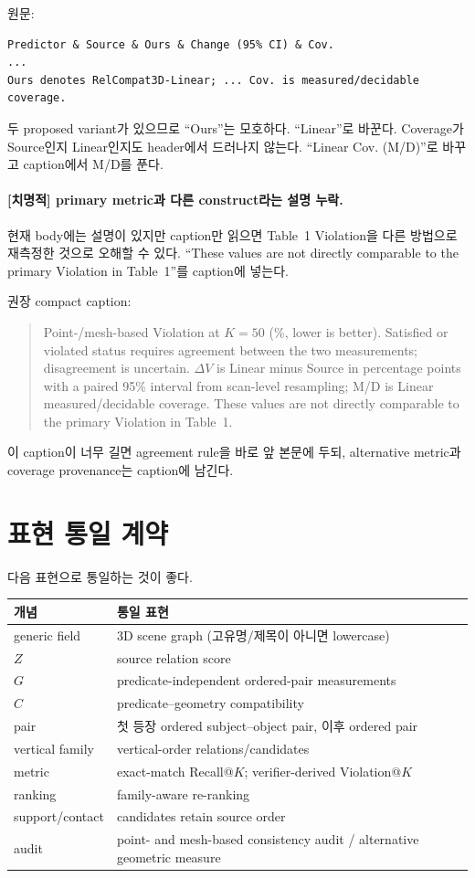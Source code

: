 \documentclass[11pt]{article}
\newcommand{\fatal}{\textbf{\textcolor{fatalred}{[치명적]}}}
\begin{document}
원문:
\begin{verbatim}
Predictor & Source & Ours & Change (95% CI) & Cov.
...
Ours denotes RelCompat3D-Linear; ... Cov. is measured/decidable coverage.
\end{verbatim}

두 proposed variant가 있으므로 ``Ours''는 모호하다. ``Linear''로 바꾼다. Coverage가
Source인지 Linear인지도 header에서 드러나지 않는다. ``Linear Cov. (M/D)''로
바꾸고 caption에서 M/D를 푼다.

\paragraph{\fatal{} primary metric과 다른 construct라는 설명 누락.}

현재 body에는 설명이 있지만 caption만 읽으면 Table~1 Violation을 다른 방법으로
재측정한 것으로 오해할 수 있다. ``These values are not directly comparable to the
primary Violation in Table~1''를 caption에 넣는다.

권장 compact caption:
\begin{quote}
Point-/mesh-based Violation at $K=50$ (\%, lower is better). Satisfied or
violated status requires agreement between the two measurements; disagreement
is uncertain. $\Delta V$ is Linear minus Source in percentage points with a
paired 95\% interval from scan-level resampling; M/D is Linear
measured/decidable coverage. These values are not directly comparable to the
primary Violation in Table~1.
\end{quote}

이 caption이 너무 길면 agreement rule을 바로 앞 본문에 두되, alternative metric과
coverage provenance는 caption에 남긴다.

\section{표현 통일 계약}

다음 표현으로 통일하는 것이 좋다.

\begin{longtable}{@{}p{}p{}@{}}
\toprule
개념 & 통일 표현 \\
\midrule
generic field & 3D scene graph (고유명/제목이 아니면 lowercase) \\
$Z$ & source relation score \\
$G$ & predicate-independent ordered-pair measurements \\
$C$ & predicate--geometry compatibility \\
pair & 첫 등장 ordered subject--object pair, 이후 ordered pair \\
vertical family & vertical-order relations/candidates \\
metric & exact-match Recall@$K$; verifier-derived Violation@$K$ \\
ranking & family-aware re-ranking \\
support/contact & candidates retain source order \\
audit & point- and mesh-based consistency audit / alternative geometric measure \\
\bottomrule
\end{longtable}
\end{document}
